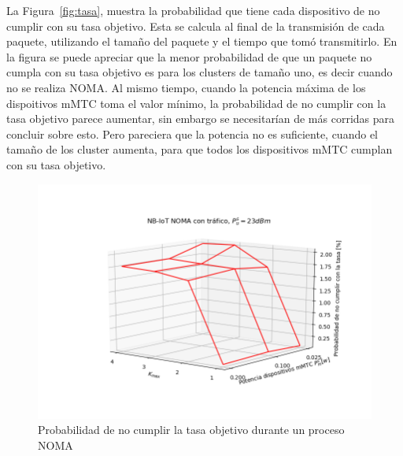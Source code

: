 La Figura~\ref{fig:tasa}, muestra la probabilidad que tiene cada dispositivo de no cumplir con su tasa objetivo. Esta se calcula al final de la transmisión de cada paquete, utilizando el tamaño del paquete y el tiempo que tomó transmitirlo. En la figura se puede apreciar que la menor probabilidad de que un paquete no cumpla con su tasa objetivo es para los clusters de tamaño uno, es decir cuando no se realiza NOMA. Al mismo tiempo, cuando la potencia máxima de los dispoitivos mMTC toma el valor mínimo, la probabilidad de no cumplir con la tasa objetivo parece aumentar, sin embargo se necesitarían de más corridas para concluir sobre esto. Pero pareciera que la potencia no es suficiente, cuando el tamaño de los cluster aumenta, para que todos los dispositivos mMTC cumplan con su tasa objetivo. \newline


\begin{figure}[th]
    \centering
    \includegraphics[scale=0.9]{Figures/ResultadosTrafico/Figure_3.png}
    \decoRule
    \caption[Probabilidad de no cumplir la tasa objetivo entre procesos NOMA]{Probabilidad de no cumplir la tasa objetivo durante un proceso NOMA}
    \label{fig:tasaNOMA}
\end{figure}

